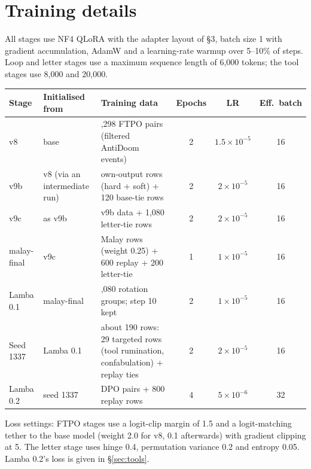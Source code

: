 \documentclass[11pt]{article}
\begin{document}
\section{Training details}
\label{app:hparams}

All stages use NF4 QLoRA with the adapter layout of \S3, batch size 1 with gradient accumulation, AdamW and a learning-rate warmup over 5--10\% of steps. Loop and letter stages use a maximum sequence length of 6,000 tokens; the tool stages use 8,000 and 20,000.

\begin{table}[h]
\centering
\small
\setlength{\tabcolsep}{4pt}
\begin{tabular}{>{\raggedright\arraybackslash}p{2.0cm}>{\raggedright\arraybackslash}p{2.6cm}>{\raggedright\arraybackslash}p{5.2cm}ccc}
\toprule
Stage & Initialised from & Training data & Epochs & LR & Eff.\ batch \\
\midrule
v8 & base & 1,298 FTPO pairs (filtered AntiDoom events) & 2 & $1.5\times10^{-5}$ & 16 \\
v9b & v8 (via an intermediate run) & 909 own-output rows (hard + soft) + 120 base-tie rows & 2 & $2\times10^{-5}$ & 16 \\
v9c & as v9b & v9b data + 1,080 letter-tie rows & 2 & $2\times10^{-5}$ & 16 \\
malay-final & v9c & 273 Malay rows (weight 0.25) + 600 replay + 200 letter-tie & 1 & $1\times10^{-5}$ & 16 \\
Lamba 0.1 & malay-final & 1,080 rotation groups; step 10 kept & 2 & $1\times10^{-5}$ & 16 \\
Seed 1337 & Lamba 0.1 & about 190 rows: 29 targeted rows (tool rumination, confabulation) + replay ties & 2 & $2\times10^{-5}$ & 16 \\
Lamba 0.2 & seed 1337 & 406 DPO pairs + 800 replay rows & 4 & $5\times10^{-6}$ & 32 \\
\bottomrule
\end{tabular}
\end{table}

Loss settings: FTPO stages use a logit-clip margin of 1.5 and a logit-matching tether to the base model (weight 2.0 for v8, 0.1 afterwards) with gradient clipping at 5. The letter stage uses hinge 0.4, permutation variance 0.2 and entropy 0.05. Lamba 0.2's loss is given in \S\ref{sec:tools}.

\end{document}
